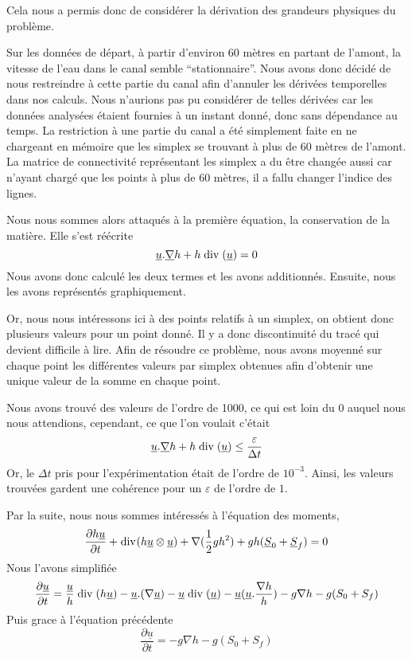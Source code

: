 \documentclass[a4paper,10pt]{article}
\begin{document}
  Cela nous a permis donc de considérer la dérivation des grandeurs physiques du problème.
  
  Sur les données de départ, à partir d'environ 60 mètres en partant de l'amont, la vitesse de l'eau dans le canal
  semble ``stationnaire''. Nous avons donc décidé de nous restreindre à cette partie du canal afin d'annuler les dérivées
  temporelles dans nos calculs. Nous n'aurions pas pu considérer de telles dérivées car les données analysées étaient fournies à
  un instant donné, donc sans dépendance au temps.
  La restriction à une partie du canal a été simplement faite en ne chargeant en mémoire que les simplex se trouvant à plus de
  60 mètres de l'amont. La matrice de connectivité représentant les simplex a du être changée aussi car n'ayant chargé que les
  points à plus de 60 mètres, il a fallu changer l'indice des lignes.
  
  Nous nous sommes alors attaqués à la première équation, la conservation de la matière.
  Elle s'est réécrite
  \begin{equation}
    \underline u . \underline \nabla h 
    +h\bdiv(\underline u) =
    0
  \end{equation}
  Nous avons donc calculé les deux termes et les avons additionnés. Ensuite, nous les avons représentés graphiquement.
  
  Or, nous nous intéressons ici à des points relatifs à un simplex, on obtient donc plusieurs valeurs pour un point donné.
  Il y a donc discontinuité du tracé qui devient difficile à lire. Afin de résoudre ce problème, nous avons moyenné sur
  chaque point les différentes valeurs par simplex obtenues afin d'obtenir une unique valeur de la somme en chaque point.
  
  Nous avons trouvé des valeurs de l'ordre de 1000, ce qui est loin du 0 auquel nous nous attendions, cependant, ce que l'on voulait
  c'était
  \begin{equation}
    \underline u . \underline \nabla h 
    +h\bdiv(\underline u) \leq
    \frac{\varepsilon}{\Delta t}
  \end{equation}
  Or, le $\Delta t$ pris pour l'expérimentation était de l'ordre de $10^{-3}$. Ainsi, les valeurs trouvées gardent une cohérence
  pour un $\varepsilon$ de l'ordre de $1$.
  
  Par la suite, nous nous sommes intéressés à l'équation des moments,
  \begin{equation}
    \frac{\partial h\underline u}{\partial t}
    +\bdiv(h\underline u \otimes \underline u)
    +\nabla(\frac 1 2 gh^2)
    +gh(\underline S_0 + \underline S_f)=
    0
  \end{equation}
  Nous l'avons simplifiée
  \begin{equation}
    \frac{\partial \underline u}{\partial t} =
    \frac{\underline u}{h} \bdiv(h\underline u)
    -\underline u.(\nabla \underline u)
    -\underline u \bdiv(\underline u)
    -\underline u(\underline u . \frac{\nabla h}{h})
    -g \nabla h
    -g(S_0 + S_f)
  \end{equation}
  Puis grace à l'équation précédente
  \begin{equation}
    \frac{\partial \underline u}{\partial t} =
    -g \nabla h
    -g(S_0 + S_f)
  \end{equation}
\end{document}
